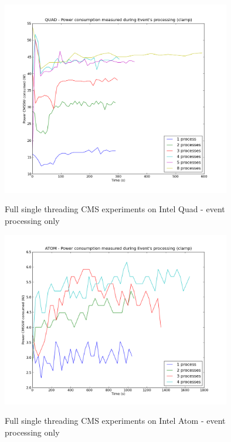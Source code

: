 \begin{figure}[h!]
  \centering
    \includegraphics[width=100mm]{"img/aalto/aalto_quadEvents"}
    \label{fig:nf_ss}
    \caption{Full single threading CMS experiments on Intel Quad - event
processing only}
\end{figure}

\begin{figure}[h!]
  \centering
    \includegraphics[width=100mm]{"img/aalto/aalto_atomEvents"}
    \label{fig:nf_ss}
    \caption{Full single threading CMS experiments on Intel Atom - event
processing only}
\end{figure}


